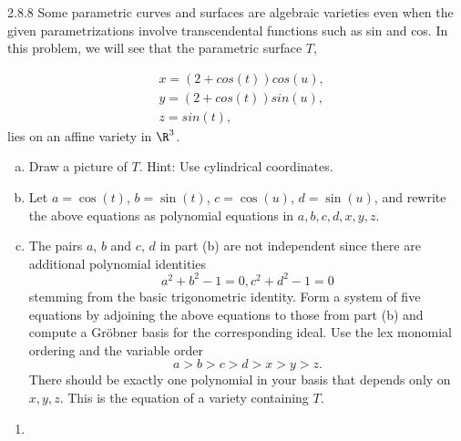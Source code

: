 \documentclass[twoside]{article}
\begin{document}
\begin{ejercicio}{2.8.8}
Some parametric curves and surfaces are algebraic varieties even when the given
parametrizations involve transcendental functions such as sin and cos. In this problem,
we will see that the parametric surface $T$,

\begin{align*}
&x = (2 + cos(t)) cos(u),\\
&y = (2 + cos(t)) sin(u),\\
&z = sin(t),
\end{align*}
lies on an affine variety in $\R^3$.
\begin{enumerate}[a.]
\item Draw a picture of $T$. Hint: Use cylindrical coordinates.
\item Let $a = \cos(t)$, $b = \sin(t)$, $c = \cos(u)$, $d = \sin(u)$, and rewrite the above equations
as polynomial equations in $a, b, c, d, x, y, z$.
\item The pairs $a$, $b$ and $c$, $d$ in part (b) are not independent since there are additional polynomial
identities
$$a^2 + b^2 − 1 = 0, c^2 + d^2 − 1 = 0$$
stemming from the basic trigonometric identity. Form a system of five equations by
adjoining the above equations to those from part (b) and compute a Gröbner basis for
the corresponding ideal. Use the lex monomial ordering and the variable order
$$a > b > c > d > x > y > z.$$
There should be exactly one polynomial in your basis that depends only on $x, y, z$.
This is the equation of a variety containing $T$.
\end{enumerate}
\end{ejercicio}
\begin{solucion}
\begin{enumerate}
\item[]

\end{enumerate}

\end{solucion}

\newpage
\end{document}
